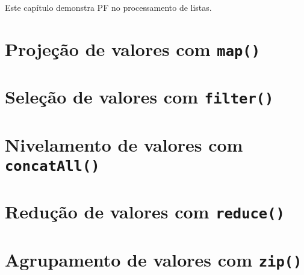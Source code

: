 Este capítulo demonstra PF no processamento de listas.

\section{Projeção de valores com \texttt{map()}}
\label{sec:org397e2f7}
\section{Seleção de valores com \texttt{filter()}}
\label{sec:orgeac80e2}
\section{Nivelamento de valores com \texttt{concatAll()}}
\label{sec:org99ed9f9}
\section{Redução de valores com \texttt{reduce()}}
\label{sec:orga3b0643}
\section{Agrupamento de valores com \texttt{zip()}}
\label{sec:org17959de}
